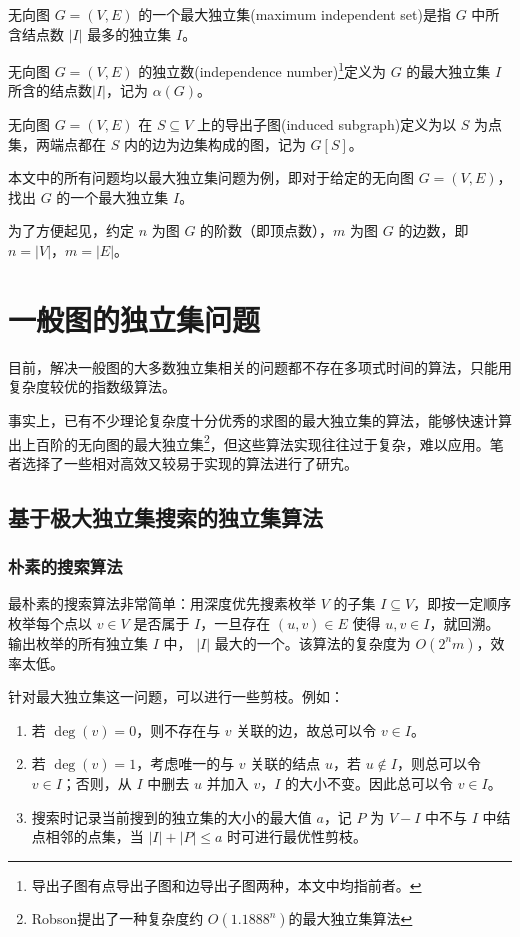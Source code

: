 \documentclass[lang=cn,11pt,a4paper]{elegantpaper}
\begin{document}
\begin{definition}
    无向图 $G = (V, E)$ 的一个最大独立集(maximum independent set)是指 $G$ 中所含结点数 $|I|$ 最多的独立集 $I$。
\end{definition}

\begin{definition}
    无向图 $G = (V, E)$ 的独立数(independence number)\footnote{导出子图有点导出子图和边导出子图两种，本文中均指前者。}定义为 $G$ 的最大独立集 $I$ 所含的结点数$|I|$，记为 $\alpha(G)$。
\end{definition}

\begin{definition}
    无向图 $G = (V, E)$ 在 $S \subseteq V$ 上的导出子图(induced subgraph)定义为以 $S$ 为点集，两端点都在 $S$ 内的边为边集构成的图，记为 $G[S]$。
\end{definition}

本文中的所有问题均以最大独立集问题为例，即对于给定的无向图 $G = (V, E)$，找出 $G$ 的一个最大独立集 $I$。

为了方便起见，约定 $n$ 为图 $G$ 的阶数（即顶点数），$m$ 为图 $G$ 的边数，即 $n = |V|$，$m = |E|$。


\section{一般图的独立集问题}
目前，解决一般图的大多数独立集相关的问题都不存在多项式时间的算法，只能用复杂度较优的指数级算法。

事实上，已有不少理论复杂度十分优秀的求图的最大独立集的算法，能够快速计算出上百阶的无向图的最大独立集\footnote{Robson提出了一种复杂度约 $O(1.1888^n)$的最大独立集算法}，但这些算法实现往往过于复杂，难以应用。笔者选择了一些相对高效又较易于实现的算法进行了研宄。

\subsection{基于极大独立集搜索的独立集算法}
\subsubsection{朴素的搜索算法}
最朴素的搜索算法非常简单：用深度优先搜素枚举 $V$ 的子集 $I \subseteq V$，即按一定顺序枚举每个点以 $v \in V$ 是否属于 $I$，一旦存在 $(u, v) \in E$ 使得 $u, v \in I$，就回溯。输出枚举的所有独立集 $I$ 中， $|I|$ 最大的一个。该算法的复杂度为 $O(2^nm)$，效率太低。

针对最大独立集这一问题，可以进行一些剪枝。例如：
\begin{enumerate}
    \item 若 $\deg(v) = 0$，则不存在与 $v$ 关联的边，故总可以令 $v \in I$。
    \item 若 $\deg(v) = 1$，考虑唯一的与 $v$ 关联的结点 $u$，若 $u \notin I$，则总可以令 $v \in I$；否则，从 $I$ 中删去 $u$ 并加入 $v$，$I$ 的大小不变。因此总可以令 $v \in I$。
    \item 搜索时记录当前搜到的独立集的大小的最大值 $a$，记 $P$ 为 $V-I$ 中不与 $I$ 中结点相邻的点集，当 $|I| + |P| \le a$ 时可进行最优性剪枝。
\end{enumerate}
\end{document}
